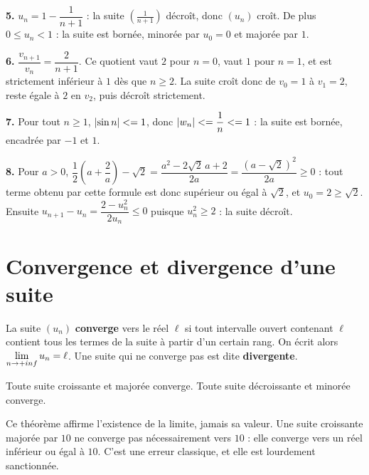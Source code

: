 \begin{corrige}
\textbf{5.} $u_{n} = 1-\dfrac{1}{n+1}$ : la suite $\left(\frac{1}{n+1}\right)$
décroît, donc $(u_{n})$ croît. De plus $0 \leq u_{n} < 1$ : la suite est
bornée, minorée par $u_{0} = 0$ et majorée par $1$.

\textbf{6.} $\dfrac{v_{n+1}}{v_{n}} = \dfrac{2}{n+1}$. Ce quotient vaut $2$
pour $n = 0$, vaut $1$ pour $n = 1$, et est strictement inférieur à $1$ dès
que $n \geq 2$. La suite croît donc de $v_{0} = 1$ à $v_{1} = 2$, reste égale
à $2$ en $v_{2}$, puis décroît strictement.

\textbf{7.} Pour tout $n \geq 1$, $\left|\sin n\right| <= 1$, donc
$\left|w_{n}\right| <= \dfrac1n <= 1$ : la suite est bornée, encadrée par $-1$ et
$1$.

\textbf{8.} Pour $a>0$, $\dfrac12\left(a+\dfrac2a\right)-\sqrt2
= \dfrac{a^{2}-2\sqrt2\,a+2}{2a} = \dfrac{\left(a-\sqrt2\right)^{2}}{2a}
\geq 0$ : tout terme obtenu par cette formule est donc supérieur ou égal à
$\sqrt2$, et $u_{0} = 2 \geq \sqrt2$. Ensuite
$u_{n+1}-u_{n} = \dfrac{2-u_{n}^{2}}{2u_{n}} \leq 0$ puisque
$u_{n}^{2} \geq 2$ : la suite décroît.
\end{corrige}

\section{Convergence et divergence d'une suite}

\begin{definition}
La suite $(u_{n})$ \textbf{converge} vers le réel $\ell$ si tout intervalle
ouvert contenant $\ell$ contient tous les termes de la suite à partir d'un
certain rang. On écrit alors $\limn u_{n} = \ell$. Une suite qui ne converge
pas est dite \textbf{divergente}.
\end{definition}

\begin{theoreme}
Toute suite croissante et majorée converge. Toute suite décroissante et
minorée converge.
\end{theoreme}

\begin{avertissement}
Ce théorème affirme l'existence de la limite, jamais sa valeur. Une suite
croissante majorée par $10$ ne converge pas nécessairement vers $10$ : elle
converge vers un réel inférieur ou égal à $10$. C'est une erreur classique, et
elle est lourdement sanctionnée.
\end{avertissement}

